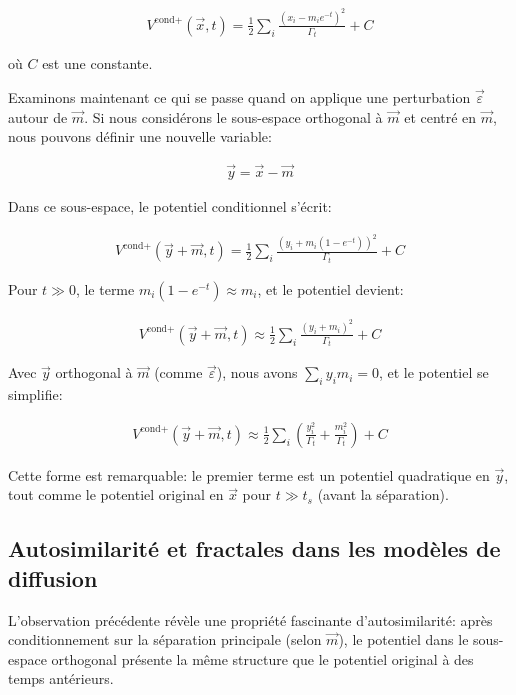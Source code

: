 \documentclass[11pt,a4paper]{article}
\begin{document}
\begin{align}
V^{\text{cond}+}(\vec{x}, t) = \frac{1}{2}\sum_i \frac{(x_i - m_i e^{-t})^2}{\Gamma_t} + C
\end{align}

où $C$ est une constante.

Examinons maintenant ce qui se passe quand on applique une perturbation $\vec{\varepsilon}$ autour de $\vec{m}$. Si nous considérons le sous-espace orthogonal à $\vec{m}$ et centré en $\vec{m}$, nous pouvons définir une nouvelle variable:

\begin{align}
\vec{y} = \vec{x} - \vec{m}
\end{align}

Dans ce sous-espace, le potentiel conditionnel s'écrit:

\begin{align}
V^{\text{cond}+}(\vec{y} + \vec{m}, t) = \frac{1}{2}\sum_i \frac{(y_i + m_i(1-e^{-t}))^2}{\Gamma_t} + C
\end{align}

Pour $t \gg 0$, le terme $m_i(1-e^{-t}) \approx m_i$, et le potentiel devient:

\begin{align}
V^{\text{cond}+}(\vec{y} + \vec{m}, t) \approx \frac{1}{2}\sum_i \frac{(y_i + m_i)^2}{\Gamma_t} + C
\end{align}

Avec $\vec{y}$ orthogonal à $\vec{m}$ (comme $\vec{\varepsilon}$), nous avons $\sum_i y_i m_i = 0$, et le potentiel se simplifie:

\begin{align}
V^{\text{cond}+}(\vec{y} + \vec{m}, t) \approx \frac{1}{2}\sum_i \left(\frac{y_i^2}{\Gamma_t} + \frac{m_i^2}{\Gamma_t}\right) + C
\end{align}

Cette forme est remarquable: le premier terme est un potentiel quadratique en $\vec{y}$, tout comme le potentiel original en $\vec{x}$ pour $t \gg t_s$ (avant la séparation).

\subsection{Autosimilarité et fractales dans les modèles de diffusion}

L'observation précédente révèle une propriété fascinante d'autosimilarité: après conditionnement sur la séparation principale (selon $\vec{m}$), le potentiel dans le sous-espace orthogonal présente la même structure que le potentiel original à des temps antérieurs.
\end{document}
